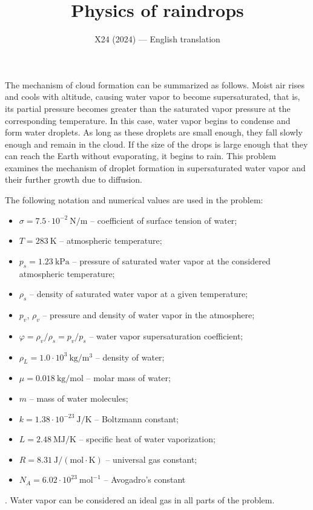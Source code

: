 \documentclass[11pt,a4paper]{article}
\title{\textbf{Physics of raindrops}}
\author{\normalsize X24 (2024) --- English translation}
\date{}
\begin{document}
\maketitle

The mechanism of cloud formation can be summarized as follows. Moist air rises and cools with altitude, causing water vapor to become supersaturated, that is, its partial pressure becomes greater than the saturated vapor pressure at the corresponding temperature. In this case, water vapor begins to condense and form water droplets. As long as these droplets are small enough, they fall slowly enough and remain in the cloud. If the size of the drops is large enough that they can reach the Earth without evaporating, it begins to rain. This problem examines the mechanism of droplet formation in supersaturated water vapor and their further growth due to diffusion.

The following notation and numerical values are used in the problem: 
\begin{itemize}
    \item $\sigma = 7.5 \cdot 10^{-2} ~\text{N}/\text{m}$ -- coefficient of surface tension of water;
    \item $T = 283~\text{K}$ -- atmospheric temperature;
    \item $p_s = 1.23~\text{kPa}$ -- pressure of saturated water vapor at the considered atmospheric temperature;
    \item $\rho_s$ -- density of saturated water vapor at a given temperature;
    \item $p_v$, $\rho_v$ -- pressure and density of water vapor in the atmosphere;
    \item $\varphi = \rho_v/\rho_s = p_v/p_s$ -- water vapor supersaturation coefficient;
    \item $\rho_L = 1.0 \cdot 10^3 ~\text{kg}/\text{m}^3$ -- density of water;
    \item $\mu = 0.018 ~\text{kg}/\text{mol}$ -- molar mass of water;
    \item $m$ -- mass of water molecules;
    \item $k = 1.38 \cdot 10^{-23}~\text{J}/\text{K}$ -- Boltzmann constant;
    \item $L = 2.48 ~\text{MJ}/\text{K}$ -- specific heat of water vaporization;
    \item $R = 8.31~\text{J}/(\text{mol} \cdot \text{K})$ -- universal gas constant;
    \item $N_A = 6.02 \cdot 10^{23}~\text{mol}^{-1}$ -- Avogadro's constant
\end{itemize}
. Water vapor can be considered an ideal gas in all parts of the problem.
\end{document}
